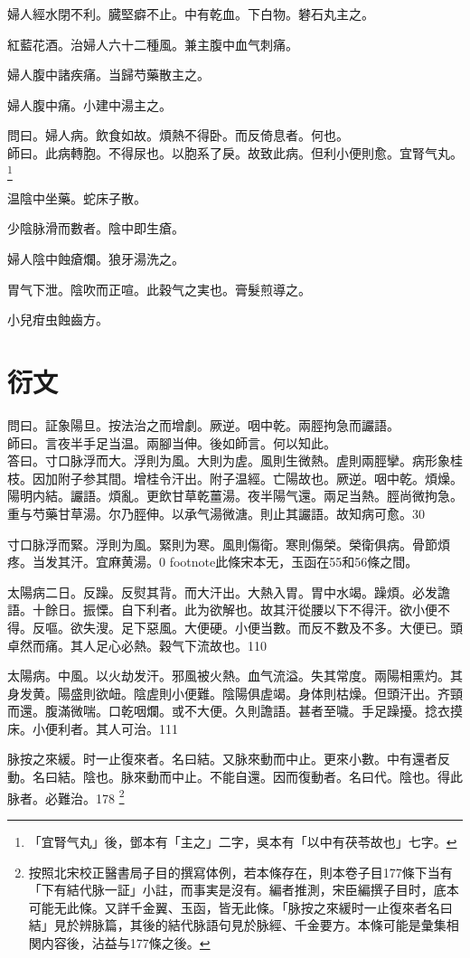 婦人經水閉不利。臓堅癖不止。中有乾血。下白物。礬石丸主之。

紅藍花酒。治婦人六十二種風。兼主腹中血气刺痛。

婦人腹中諸疾痛。当歸芍藥散主之。

婦人腹中痛。小建中湯主之。

問曰。婦人病。飲食如故。煩熱不得卧。而反倚息者。何也。\\
師曰。此病轉胞。不得尿也。以胞系了戾。故致此病。但利小便則愈。宜腎气丸。
	\footnote{「宜腎气丸」後，鄧本有「主之」二字，吳本有「以中有茯苓故也」七字。}

温陰中坐藥。蛇床子散。

少陰脉滑而數者。陰中即生瘡。

{\khaaitp 婦人}陰中蝕瘡爛。狼牙湯洗之。

胃气下泄。陰吹而正喧。此穀气之実也。膏髮煎導之。

小兒疳虫蝕齒方。

\part{衍文}

問曰。証象陽旦。按法治之而增劇。厥逆。咽中乾。兩脛拘急而讝語。\\
師曰。言夜半手足当温。兩腳当伸。後如師言。何以知此。\\
答曰。寸口脉浮而大。浮{\khaaitp 則}为風。大{\khaaitp 則}为虗。風則生微熱。虗則兩脛攣。病形象桂枝。因加附子参其間。增桂令汗出。附子温經。亡陽故也。厥逆。咽中乾。煩燥。陽明内結。讝語。煩亂。更飲甘草乾薑湯。夜半陽气還。兩足当熱。脛尚微拘急。重与芍藥甘草湯。尔乃脛伸。以承气湯微溏。則止其讝語。故知病可愈。30

{\khaaitp 寸口}脉浮而緊。浮則为風。緊則为寒。風則傷衛。寒則傷榮。榮衛俱病。骨節煩疼。当发其汗。宜麻黄湯。0
	footnote{此條宋本无，玉函在55和56條之間。}

太陽病二日。反躁。反熨其背。而大汗出。大熱入胃。胃中水竭。躁煩。必发譫語。十餘日。振慄。自下利者。此为欲解也。故其汗從腰以下不得汗。欲小便不得。反嘔。欲失溲。足下惡風。大便硬。小便当數。而反不數及不多。大便已。頭卓然而痛。其人足心必熱。穀气下流故也。110

太陽病。中風。以火劫发汗。邪風被火熱。血气流溢。失其常度。兩陽相熏灼。其身发黄。陽盛則欲衄。陰虗{\khaaitp 則}小便難。陰陽俱虗竭。身体則枯燥。但頭汗出。齐頸而還。腹滿微喘。口乾咽爛。或不大便。久則譫語。甚者至噦。手足躁擾。捻衣摸床。小便利者。其人可治。111

脉按之來緩。时一止復來者。名曰結。又脉來動而中止。更來小數。中有還者反動。名曰結。陰也。脉來動而中止。不能自還。因而復動者。名曰代。陰也。得此脉者。必難治。178
\footnote{按照北宋校正醫書局子目的撰寫体例，若本條存在，則本卷子目177條下当有「下有結代脉一証」小註，而事実是沒有。編者推測，宋臣編撰子目时，底本可能无此條。又詳千金翼、玉函，皆无此條。「脉按之來緩时一止復來者名曰結」見於辨脉篇，其後的結代脉語句見於脉經、千金要方。本條可能是彙集相関内容後，沾益与177條之後。}

